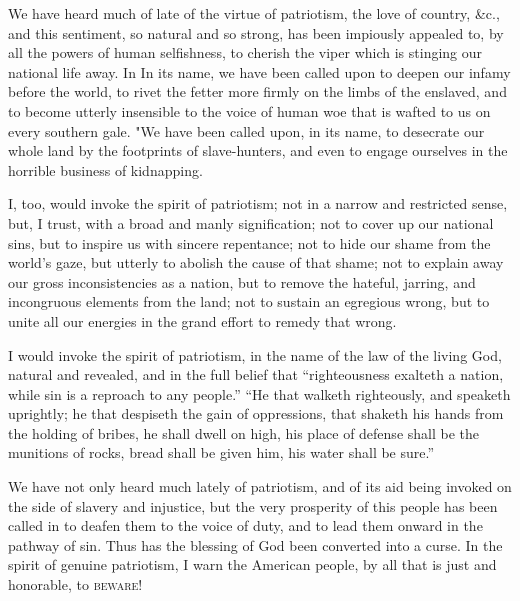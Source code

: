 We have heard much of late of the virtue of patriotism, the love of
country, \&c., and this sentiment, so natural and so strong, has been
impiously appealed to, by all the powers of human selfishness, to
cherish the viper which is stinging our national life away. In In its
name, we have been called upon to deepen our infamy before the world, to
rivet the fetter more firmly on the limbs of the enslaved, and to become
utterly insensible to the voice of human woe that is wafted to us on
every southern gale. "We have been called upon, in its name, to
desecrate our whole land by the footprints of slave-hunters, and even to
engage ourselves in the horrible business of kidnapping.

I, too, would invoke the spirit of patriotism; not in a narrow and
restricted sense, but, I trust, with a broad and manly signification;
not to cover up our national sins, but to inspire us with sincere
repentance; not to hide our shame from the world's gaze, but utterly to
abolish the cause of that shame; not to explain away our gross
inconsistencies as a nation, but to remove the hateful, jarring, and
incongruous elements from the land; not to sustain an egregious wrong,
but to unite all our energies in the grand effort to remedy that wrong.

I would invoke the spirit of patriotism, in the name of the law of the
living God, natural and revealed, and in the full belief that
``righteousness exalteth a nation, while sin is a reproach to any
people.'' ``He that walketh righteously, and speaketh uprightly; he that
despiseth the gain of oppressions, that shaketh his hands from the
holding of bribes, he shall dwell on high, his place of defense shall be
the munitions of rocks, bread shall be given him, his water shall be
sure.''

We have not only heard much lately of patriotism, and of its aid
{\protect\hypertarget{440}{}{}}being invoked on the side of slavery and
injustice, but the very prosperity of this people has been called in to
deafen them to the voice of duty, and to lead them onward in the pathway
of sin. Thus has the blessing of God been converted into a curse. In the
spirit of genuine patriotism, I warn the American people, by all that is
just and honorable, to \textsc{beware}!

